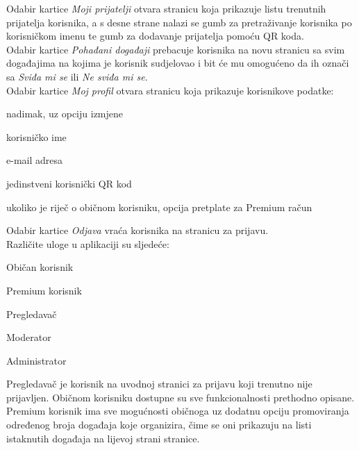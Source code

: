 		\indent Odabir kartice \textit{Moji prijatelji} otvara stranicu koja prikazuje listu trenutnih prijatelja korisnika, a s desne strane nalazi se gumb za pretraživanje korisnika po korisničkom imenu te gumb za dodavanje prijatelja pomoću QR koda. \\
		
		\indent Odabir kartice \textit{Pohađani događaji} prebacuje korisnika na novu stranicu sa svim događajima na kojima je korisnik sudjelovao i bit će mu omogućeno da ih označi sa \textit{Sviđa mi se} ili \textit{Ne sviđa mi se}. \\
		
		\indent Odabir kartice \textit{Moj profil} otvara stranicu koja prikazuje korisnikove podatke:
		
		\begin{packed_item}
			\item nadimak, uz opciju izmjene
			\item korisničko ime
			\item e-mail adresa
			\item jedinstveni korisnički QR kod
			\item ukoliko je riječ o običnom korisniku, opcija pretplate za Premium račun
		\end{packed_item}
		
		\indent Odabir kartice \textit{Odjava} vraća korisnika na stranicu za prijavu. \\
		
		\indent Različite uloge u aplikaciji su sljedeće:
		
		\begin{packed_item}
			\item Običan korisnik
			\item Premium korisnik
			\item Pregledavač
			\item Moderator
			\item Administrator
		\end{packed_item}
	
		\indent Pregledavač je korisnik na uvodnoj stranici za prijavu koji trenutno nije prijavljen. Običnom korisniku dostupne su sve funkcionalnosti prethodno opisane. \\
		
		\indent Premium korisnik ima sve mogućnosti običnoga uz dodatnu opciju promoviranja određenog broja događaja koje organizira, čime se oni prikazuju na listi istaknutih događaja na lijevoj strani stranice. \\
		
